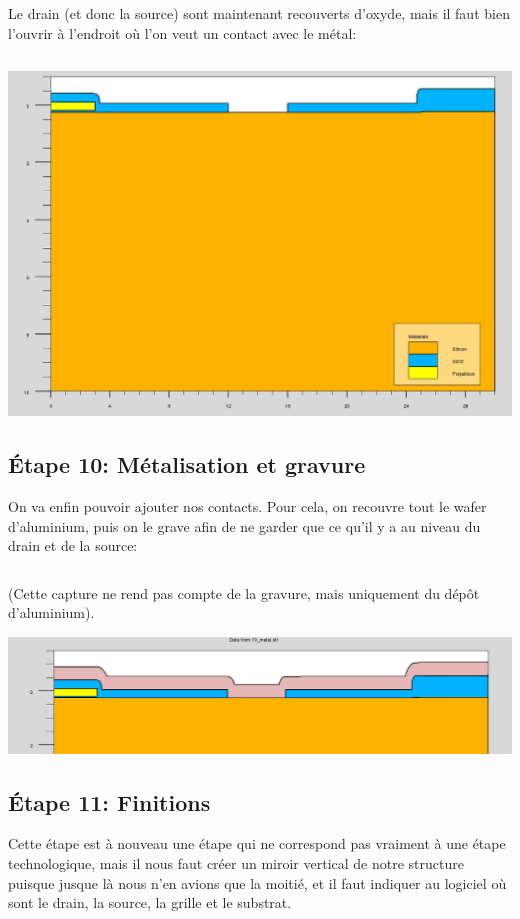 \documentclass{article}
\begin{document}
Le drain (et donc la source) sont maintenant recouverts d’oxyde, mais il faut bien l’ouvrir à l’endroit où l’on veut un contact avec le métal:
\inputminted[linenos,firstnumber=80,firstline=80,lastline=86]{sh}{final_named.in}

\includegraphics[width=\linewidth]{9_via.png}

\subsection{Étape 10: Métalisation et gravure}
On va enfin pouvoir ajouter nos contacts. Pour cela, on recouvre tout le wafer d’aluminium, puis on le grave afin de ne garder que ce qu’il y a au niveau du drain et de la source:
\inputminted[linenos,firstnumber=87,firstline=87,lastline=97]{sh}{final_named.in}

(Cette capture ne rend pas compte de la gravure, mais uniquement du dépôt d’aluminium).

\includegraphics[width=\linewidth]{10_depot_metal.png}

\subsection{Étape 11: Finitions}
Cette étape est à nouveau une étape qui ne correspond pas vraiment à une étape technologique, mais il nous faut créer un miroir vertical de notre structure puisque jusque là nous n’en avions que la moitié, et il faut indiquer au logiciel où sont le drain, la source, la grille et le substrat.
\end{document}
